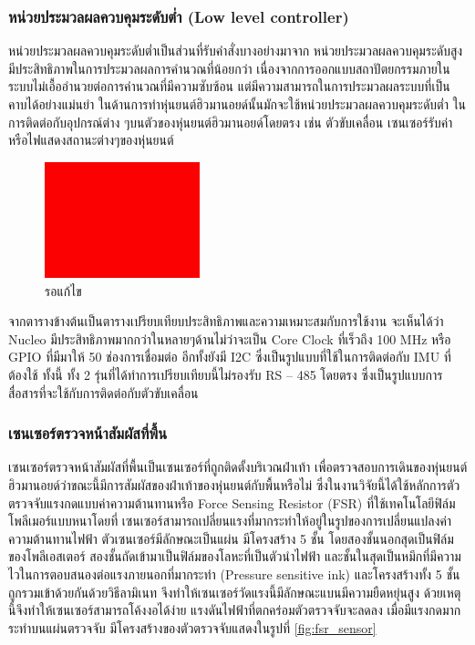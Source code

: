 \subsubsection*{หน่วยประมวลผลควบคุมระดับต่ำ (Low level controller)}
หน่วยประมวลผลควบคุมระดับต่ำเป็นส่วนที่รับคำสั่งบางอย่างมาจาก หน่วยประมวลผลควบคุมระดับสูง
มีประสิทธิภาพในการประมวลผลการคำนวณที่น้อยกว่า เนื่องจากการออกแบบสถาปัตยกรรมภายในระบบไม่เอื้ออำนวยต่อการคำนวณที่มีความซับซ้อน
แต่มีความสามารถในการประมวลผลระบบที่เป็นคาบได้อย่างแม่นยำ ในด้านการทำหุ่นยนต์ฮิวมานอยด์นั้นมักจะใช้หน่วยประมวลผลควบคุมระดับต่ำ
ในการติดต่อกับอุปกรณ์ต่าง ๆบนตัวของหุ่นยนต์ฮิวมานอยด์โดยตรง เช่น ตัวขับเคลื่อน เซนเซอร์รับค่า หรือไฟแสดงสถานะต่างๆของหุ่นยนต์
\begin{figure}[htbp]
    \centering
    \includegraphics[width=0.40\textwidth]{chapter2/images/toedit.jpg}
    \caption{รอแก้ไข}
    \label{fig:toedit}
\end{figure}
จากตารางข้างต้นเป็นตารางเปรียบเทียบประสิทธิภาพและความเหมาะสมกับการใช้งาน จะเห็นได้ว่า Nucleo
มีประสิทธิภาพมากกว่าในหลายๆด้านไม่ว่าจะเป็น Core Clock ที่เร็วถึง 100 MHz หรือ GPIO ที่มีมาให้ 50
ช่องการเชื่อมต่อ อีกทั้งยังมี I2C ซึ่งเป็นรูปแบบที่ใช้ในการติดต่อกับ IMU ที่ต้องใช้ ทั้งนี้ ทั้ง 2
รุ่นที่ได้ทำการเปรียบเทียบนี้ไม่รองรับ RS – 485 โดยตรง ซึ่งเป็นรูปแบบการสื่อสารที่จะใช้กับการติดต่อกับตัวขับเคลื่อน

\subsubsection{เซนเซอร์ตรวจหน้าสัมผัสที่พื้น}
เซนเซอร์ตรวจหน้าสัมผัสที่พื้นเป็นเซนเซอร์ที่ถูกติดตั้งบริเวณฝ่าเท้า เพื่อตรวจสอบการเดินของหุ่นยนต์ฮิวมานอยด์ว่าขณะนี้มีการสัมผัสของฝ่าเท้าของหุ่นยนต์กับพื้นหรือไม่
ซึ่งในงานวิจัยนี้ได้ใช้หลักการตัวตรวจจับแรงกดแบบค่าความต้านทานหรือ Force Sensing Resistor (FSR) ที่ใช้เทคโนโลยีฟิล์มโพลีเมอร์แบบหนาโดยที่
เซนเซอร์สามารถเปลี่ยนแรงที่มากระทำให้อยู่ในรูปของการเปลี่ยนแปลงค่าความต้านทานไฟฟ้า ตัวเซนเซอร์มีลักษณะเป็นแผ่น มีโครงสร้าง 5 ชั้น
โดยสองชั้นนอกสุดเป็นฟิล์มของโพลีเอสเตอร์ สองชั้นถัดเข้ามาเป็นฟิล์มของโลหะที่เป็นตัวนำไฟฟ้า และชั้นในสุดเป็นหมึกที่มีความไวในการตอบสนองต่อแรงภายนอกที่มากระทำ
(Pressure sensitive ink) และโครงสร้างทั้ง 5 ชั้น ถูกรวมเข้าด้วยกันด้วยวิธีลามิเนท จึงทำให้เซนเซอร์วัดแรงนี้มีลักษณะแบนมีความยืดหยุ่นสูง
ด้วยเหตุนี้จึงทำให้เซนเซอร์สามารถโค้งงอได้ง่าย แรงดันไฟฟ้าที่ตกคร่อมตัวตรวจจับจะลดลง เมื่อมีแรงกดมากระทำบนแผ่นตรวจจับ มีโครงสร้างของตัวตรวจจับแสดงในรูปที่ \ref{fig:fsr_sensor} 

